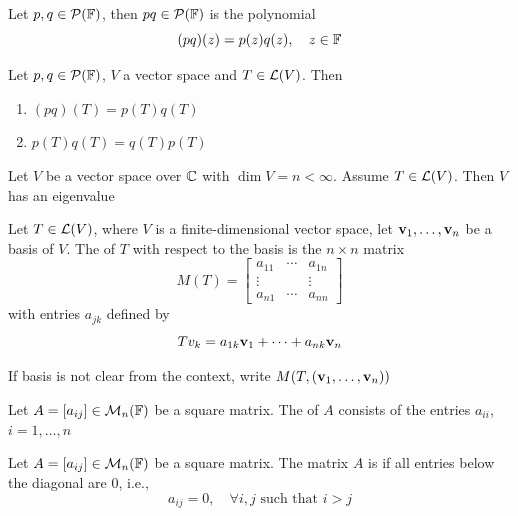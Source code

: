 \documentclass[aspectratio=169]{beamer}
\begin{document}
\begin{frame}
\begin{definition}
Let $p,q\in\mathcal{P}(\mathbb{F})$, then $pq\in\mathcal{P}(\mathbb{F})$ is the polynomial
\[
(pq)(z)=p(z)q(z),\quad z\in\mathbb{F}
\]
\end{definition}
\vfill
\begin{theorem}
Let $p,q\in\mathcal{P}(\mathbb{F})$, $V$ a vector space and $T\in\mathcal{L}(V)$. Then
\begin{enumerate}
\item $(pq)(T)=p(T)q(T)$
\item $p(T)q(T)=q(T)p(T)$
\end{enumerate}
\end{theorem}
\end{frame}

\begin{frame}
\begin{importanttheorem}
Let $V$ be a vector space over $\mathbb{C}$ with $\dim V=n<\infty$. Assume $T\in\mathcal{L}(V)$. Then $V$ has an eigenvalue
\end{importanttheorem}
\end{frame}

\begin{frame}
\begin{definition}
Let $T\in\mathcal{L}(V)$, where $V$ is a finite-dimensional vector space, let $\mathbf{v}_1,\ldots,\mathbf{v}_n$ be a basis of $V$. The  of $T$ with respect to the basis is the $n\times n$ matrix
\[
M(T)=
\begin{bmatrix}
a_{11} & \cdots & a_{1n} \\
\vdots & & \vdots \\
a_{n1} & \cdots & a_{nn}
\end{bmatrix}
\]
with entries $a_{jk}$ defined by
\[
Tv_k = a_{1k}\mathbf{v}_1+\cdots+a_{nk}\mathbf{v}_n
\]
\end{definition}
If basis is not clear from the context, write $M(T,(\mathbf{v}_1,\ldots,\mathbf{v}_n))$
\end{frame}

\begin{frame}
\begin{definition}
Let $A=[a_{ij}]\in\mathcal{M}_n(\mathbb{F})$ be a square matrix. The  of $A$ consists of the entries $a_{ii}$, $i=1,\ldots,n$
\end{definition}
\vfill
\begin{definition}
Let $A=[a_{ij}]\in\mathcal{M}_n(\mathbb{F})$ be a square matrix. The matrix $A$ is  if all entries below the diagonal are 0, i.e., 
\[
a_{ij}=0, \quad\forall i,j\textrm{ such that }i> j
\]
\end{definition}
\end{frame}
\end{document}
